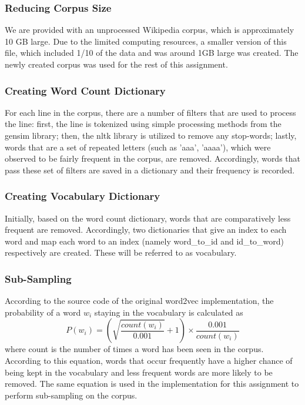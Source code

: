 \documentclass[12pt,a4paper]{article}
\begin{document}
	\subsubsection{Reducing Corpus Size}
	We are provided with an unprocessed Wikipedia corpus, which is approximately 10 GB large. Due to the limited computing resources, a smaller version of this file, which included 1/10 of the data and was around 1GB large was created. The newly created corpus was used for the rest of this assignment. 
	
	\subsubsection{Creating Word Count Dictionary}
	For each line in the corpus, there are a number of filters that are used to process the line: first, the line is tokenized using simple processing methods from the gensim library; then, the nltk library is utilized to remove any stop-words; lastly, words that are a set of repeated letters (such as 'aaa', 'aaaa'), which were observed to be fairly frequent in the corpus, are removed. Accordingly, words that pass these set of filters are saved in a dictionary and their frequency is recorded.
	
	\subsubsection{Creating Vocabulary Dictionary}
	Initially, based on the word count dictionary, words that are comparatively less frequent are removed. Accordingly, two dictionaries that give an index to each word and map each word to an index (namely word\_to\_id and id\_to\_word) respectively are created. These will be referred to as vocabulary.
	
	\subsubsection{Sub-Sampling}
	According to the source code of the original word2vec implementation, the probability of a word $w_i$ staying in the vocabulary is calculated as 
	\begin{equation}
		P(w_i) = (\sqrt{\frac{count(w_i)}{0.001}} +1 ) \times \frac{0.001}{count(w_i)}
	\end{equation}
	where count is the number of times a word has been seen in the corpus. According to this equation, words that occur frequently have a higher chance of being kept in the vocabulary and less frequent words are more likely to be removed. The same equation is used in the implementation for this assignment to perform sub-sampling on the corpus.
	
\end{document}
